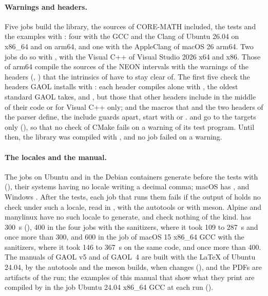 \documentclass[12pt,a4paper,twoside,openright]{book}
\begin{document}
\paragraph{Warnings and headers.} Five jobs build the library, the sources
of CORE-MATH included, the tests and the examples with
: four with the GCC and the Clang of Ubuntu 26.04
on x86\_64 and on arm64, and one with the AppleClang of macOS 26 arm64. Two
jobs do so with , with the Visual C++ of Visual Studio 2026
x64 and x86.
Those of arm64 compile the sources of the NEON intervals with the warnings
of the headers (, ) that the
intrinsics of  have to stay clear of.\newinvfive{} The
first five check the headers GAOL installs with
: each header compiles alone with
, the oldest standard GAOL takes, and
, but those that other
headers include in the middle of their code or for Visual C++ only; and the
macros that  and the two headers of the parser define, the
include guards apart, start with  or .
 and  go to the targets only
(), so that no check of CMake
fails on a warning of its test program. Until then, the library was compiled
with , and no job failed on a warning.

\paragraph{The locales and the manual.} The jobs on Ubuntu and in the Debian
containers generate  before the tests with
 (), their systems
having no locale writing a decimal comma; macOS has , and
Windows . After the tests, each job that runs them
fails if the output of  holds no check under such a locale,
read in ,  with
the autotools or  with meson.\newinvfive{}
Alpine and manylinux have no such locale to generate, and check nothing of
the kind.  has 300~s (), 400 in
the four jobs with the sanitizers, where it took 109 to 287~s and once more
than 300, and 600 in the job of macOS 15 x86\_64 GCC with the sanitizers,
where it took 146 to 367~s on the same code, and once more than 400. The manuals of GAOL v5 and of
GAOL~4 are built with the LaTeX of Ubuntu 24.04, by the autotools and the
meson builds, when  changes (), and the PDFs
are artifacts of the run; the examples of this manual that show what they
print are compiled by  in the job Ubuntu
24.04 x86\_64 GCC at each run ().
\end{document}
